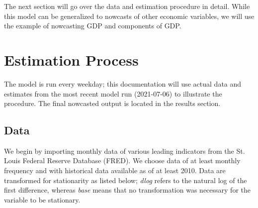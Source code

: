 \documentclass[11pt, letterpaper]{article}\usepackage[]{graphicx}\usepackage[]{color}
\begin{document}
The next section will go over the data and estimation procedure in detail. While this model can be generalized to nowcasts of other economic variables, we will use the example of nowcasting GDP and components of GDP.

\newpage
\section{Estimation Process}
The model is run every weekday; this documentation will use actual data and estimates from the most recent model run (2021-07-06) to illustrate the procedure. The final nowcasted output is located in the results section.

\subsection{Data}
We begin by importing monthly data of various leading indicators from the St. Louis Federal Reserve Database (FRED). We choose data of at least monthly frequency and with historical data available as of at least 2010. Data are transformed for stationarity as listed below; \textit{dlog} refers to the natural log of the first difference, whereas \textit{base} means that no transformation was necessary for the variable to be stationary.
\end{document}
